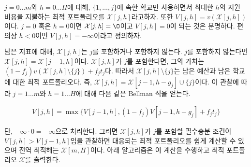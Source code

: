 \documentclass[11pt]{article} %
\newif\ifen
\theoremstyle{definition}
\theoremstyle{definition}
\begin{document}
\ifen 
For $j = 0 \dots m$ and $h = 0 \dots H$, let $\mathcal{X}[j, h]$ denote the optimal portfolio using only the schools $\{ 1, \dots, j\}$ and costing no more than $h$, and let $V[j,h] = v(\mathcal{X}[j, h])$.  It is clear that if $j=0$ or $h=0$, then $\mathcal{X}[j, h] = \O$ and $V[j, h] = 0$.  For convenience, we also define $V[j, h] = -\infty$ for all $h < 0$.
\else
$j = 0 \dots m$와 $h = 0 \dots H$에 대해, $\{ 1, \dots, j\}$에 속한 학교만 사용하면서 최대한 $h$의 지원 비용을 지불하는 최적 포트폴리오를 $\mathcal{X}[j, h]$라고하자. 또한  $V[j,h] = v(\mathcal{X}[j, h])$이다. $j=0$ 혹은 $h=0$이면 $\mathcal{X}[j, h] = \O$이고 $V[j, h] = 0$이 되는 것은 분명하다. 편의상 $h < 0$이면 $V[j, h] = -\infty$이라고 정의하자.
\fi

\ifen
For the remaining indices, $\mathcal{X}[j, h]$ either contains $j$ or not. If it does not contain $j$, then $\mathcal{X}[j, h] = \mathcal{X}[j-1, h]$. On the other hand, if  $\mathcal{X}[j, h]$ contains $j$, then its valuation is $(1 - f_j) v(\mathcal{X}[j, h]\setminus \{j\}) + f_j t_j$. This requires that $\mathcal{X}[j, h]\setminus \{j\}$ make optimal use of the remaining budget over the remaining schools; that is, $\mathcal{X}[j, h] = \mathcal{X}[j-1, h - g_j] \cup\{j\}$. From these observations, we obtain the following Bellman equation for $ j = 1\dots m$ and $h = 1\dots H$:
\else
남은 지표에 대해, $\mathcal{X}[j, h]$는 $j$를 포함하거나 포함하지 않는다. $j$를 포함하지 않는다면 $\mathcal{X}[j, h] = \mathcal{X}[j-1, h]$이다. $\mathcal{X}[j, h]$가 $j$를 포함한다면, 그의 가치는  $(1 - f_j) v(\mathcal{X}[j, h]\setminus \{j\}) + f_j t_j$다. 따라서 $\mathcal{X}[j, h]\setminus \{j\}$는 남은 예산과 남은 학교에 대한 최적 포트폴리오다. 즉,  $\mathcal{X}[j, h] = \mathcal{X}[j-1, h - g_j] \cup\{j\}$이다. 이 관찰에 따라 $ j = 1\dots m$와 $h = 1\dots H$에 대해 다음 같은 Bellman 식을 얻는다.
\fi
\begin{align}
V[j, h] = \max\bigl\{ V[j-1, h], (1 - f_j) V[j-1, h-g_j] + f_j t_j \bigr\}
\end{align}
\ifen 
with the convention that $ -\infty \cdot 0 = -\infty$. The corresponding optimal portfolios can be computed by observing that $\mathcal{X}[j, h]$ contains $j$ if and only if $V[j, h]> V[j-1, h]$. The optimal solution is given by $\mathcal{X}[m, H]$. The algorithm below performs these computations and outputs the optimal portfolio $\mathcal{X}$. 
\else
단, $ -\infty \cdot 0 = -\infty$으로 처리한다. 그러면 $\mathcal{X}[j, h]$가  $j$를 포함할 필수충분 조건이 $V[j, h]> V[j-1, h]$임을 관찰하면 대응되는 최적 포트폴리오를 쉽게 계산할 수 있으며 전역 최적해는 $\mathcal{X}[m, H]$이다. 아래 알고리즘은 이 계산을 수행하고 최적 포트폴리오 $\mathcal{X}$를 출력한다.
\fi
\end{document}
